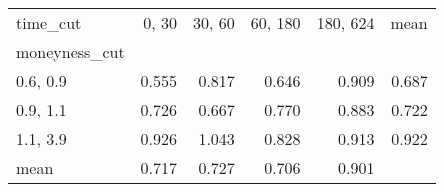 \begin{tabular}{lrrrrr}
\toprule
time\_cut &  0, 30 &  30, 60 &  60, 180 &  180, 624 &  mean \\
moneyness\_cut &          &           &            &             &       \\
\midrule
0.6, 0.9    &    0.555 &     0.817 &      0.646 &       0.909 & 0.687 \\
0.9, 1.1    &    0.726 &     0.667 &      0.770 &       0.883 & 0.722 \\
1.1, 3.9    &    0.926 &     1.043 &      0.828 &       0.913 & 0.922 \\
mean          &    0.717 &     0.727 &      0.706 &       0.901 &       \\
\bottomrule
\end{tabular}
